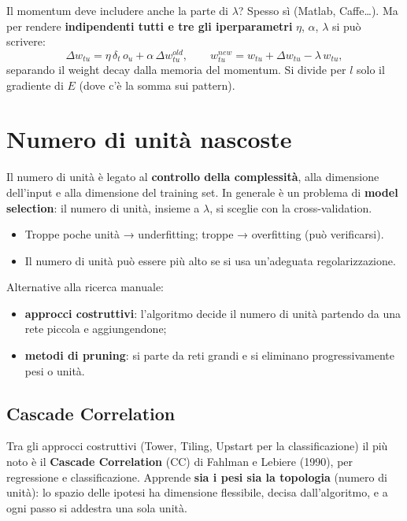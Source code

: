 Il momentum deve includere anche la parte di \(\lambda\)? Spesso sì
(Matlab, Caffe\ldots). Ma per rendere \textbf{indipendenti tutti e tre
gli iperparametri} \(\eta\), \(\alpha\), \(\lambda\) si può scrivere: \[
\Delta w_{tu} = \eta\,\delta_t\,o_u + \alpha\,\Delta w_{tu}^{old}, \qquad w_{tu}^{new} = w_{tu} + \Delta w_{tu} - \lambda\,w_{tu},
\] separando il weight decay dalla memoria del momentum. Si divide per
\(l\) solo il gradiente di \(E\) (dove c'è la somma sui pattern).

\section{Numero di unità nascoste}\label{numero-di-unituxe0-nascoste}

Il numero di unità è legato al \textbf{controllo della complessità},
alla dimensione dell'input e alla dimensione del training set. In
generale è un problema di \textbf{model selection}: il numero di unità,
insieme a \(\lambda\), si sceglie con la cross-validation.

\begin{itemize}
\tightlist
\item
  Troppe poche unità → underfitting; troppe → overfitting (può
  verificarsi).
\item
  Il numero di unità può essere più alto se si usa un'adeguata
  regolarizzazione.
\end{itemize}

Alternative alla ricerca manuale:

\begin{itemize}
\tightlist
\item
  \textbf{approcci costruttivi}: l'algoritmo decide il numero di unità
  partendo da una rete piccola e aggiungendone;
\item
  \textbf{metodi di pruning}: si parte da reti grandi e si eliminano
  progressivamente pesi o unità.
\end{itemize}

\subsection{Cascade Correlation}\label{cascade-correlation}

Tra gli approcci costruttivi (Tower, Tiling, Upstart per la
classificazione) il più noto è il \textbf{Cascade Correlation} (CC) di
Fahlman e Lebiere (1990), per regressione e classificazione. Apprende
\textbf{sia i pesi sia la topologia} (numero di unità): lo spazio delle
ipotesi ha dimensione flessibile, decisa dall'algoritmo, e a ogni passo
si addestra una sola unità.

